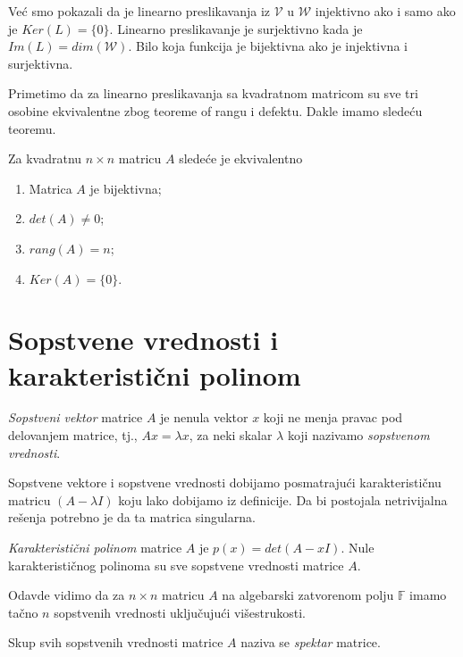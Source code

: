 \documentclass{article}
\begin{document}
Već smo pokazali da je linearno preslikavanja iz $\mathcal{V}$ u $\mathcal{W}$ injektivno ako i samo ako je $Ker(L) = \{0\}$.
Linearno preslikavanje je surjektivno kada je $Im(L) = dim(\mathcal{W})$.
Bilo koja funkcija je bijektivna ako je injektivna i surjektivna.

Primetimo da za linearno preslikavanja sa kvadratnom matricom su sve tri osobine ekvivalentne zbog teoreme of rangu i defektu.
Dakle imamo sledeću teoremu.

\begin{theorem}
  Za kvadratnu $n \times n$ matricu $A$ sledeće je ekvivalentno
  \begin{enumerate}
    \item Matrica $A$ je bijektivna;
    \item $det(A) \neq 0$;
    \item $rang(A) = n$;
    \item $Ker(A) = \{0\}$.
  \end{enumerate}
\end{theorem}

\section{Sopstvene vrednosti i karakteristični polinom}

\begin{definition}
  \textit{Sopstveni vektor} matrice $A$ je nenula vektor $x$ koji ne menja pravac pod delovanjem matrice, tj., $Ax = \lambda x$, za neki skalar $\lambda$ koji nazivamo \textit{sopstvenom vrednosti}.
\end{definition}

Sopstvene vektore i sopstvene vrednosti dobijamo posmatrajući karakterističnu matricu $(A - \lambda I)$ koju lako dobijamo iz definicije.
Da bi postojala netrivijalna rešenja potrebno je da ta matrica singularna.

\begin{definition}
  \textit{Karakteristični polinom} matrice $A$ je $p(x) = det(A - x I)$.
  Nule karakterističnog polinoma su sve sopstvene vrednosti matrice $A$.
\end{definition}

Odavde vidimo da za $n \times n$ matricu $A$ na algebarski zatvorenom polju $\mathbb{F}$ imamo tačno $n$ sopstvenih vrednosti uključujući višestrukosti.

\begin{definition}[Spektar]
  Skup svih sopstvenih vrednosti matrice $A$ naziva se \textit{spektar} matrice.
\end{definition}
\end{document}
